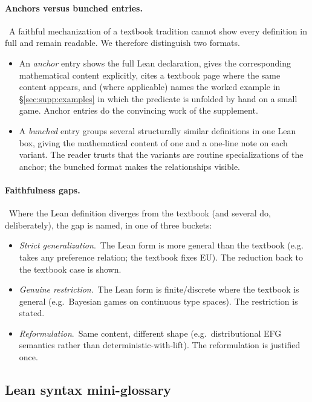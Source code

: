 \documentclass[11pt]{article}
\renewcommand{\TT}[1]{\texttt{\detokenize{#1}}}
\newcommand{\DefRef}[1]{\hyperref[def:#1]{\TT{#1}}}
\begin{document}
\paragraph{Anchors versus bunched entries.}\
A faithful mechanization of a textbook tradition cannot show every
definition in full and remain readable.  We therefore distinguish
two formats.

\begin{itemize}\itemsep2pt
\item An \emph{anchor} entry shows the full Lean declaration, gives
  the corresponding mathematical content explicitly, cites a
  textbook page where the same content appears, and (where
  applicable) names the worked example in \S\ref{sec:supp:examples}
  in which the predicate is unfolded by hand on a small game.
  Anchor entries do the convincing work of the supplement.
\item A \emph{bunched} entry groups several structurally similar
  definitions in one Lean box, giving the mathematical content of
  one and a one-line note on each variant.  The reader trusts that
  the variants are routine specializations of the anchor; the
  bunched format makes the relationships visible.
\end{itemize}

\paragraph{Faithfulness gaps.}\
Where the Lean definition diverges from the textbook (and several
do, deliberately), the gap is named, in one of three buckets:

\begin{itemize}\itemsep2pt
\item \emph{Strict generalization}.\ The Lean form is more general
  than the textbook (e.g.\ \DefRef{IsNashFor} takes any preference
  relation; the textbook fixes EU).  The
  reduction back to the textbook case is shown.
\item \emph{Genuine restriction}.\ The Lean form is finite/discrete
  where the textbook is general (e.g.\ Bayesian games on continuous
  type spaces).  The restriction is stated.
\item \emph{Reformulation}.\ Same content, different shape (e.g.\
  distributional EFG semantics rather than deterministic-with-lift).
  The reformulation is justified once.
\end{itemize}

\subsection{Lean syntax mini-glossary}
\label{sec:supp:lean-glossary}
\end{document}
